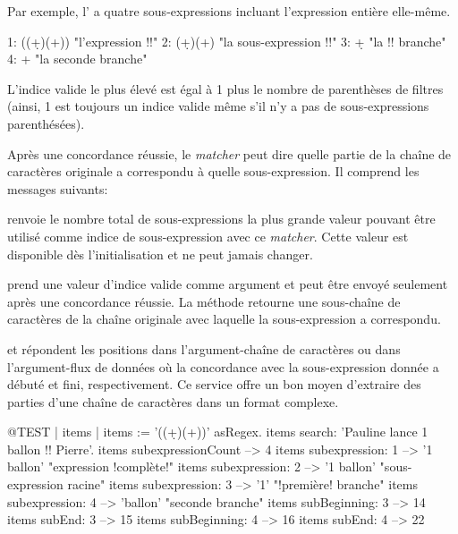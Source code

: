 \documentclass[a4paper,10pt,twoside]{book}
\begin{document}
Par exemple, l'\expreg \ct{((\d+)\s*(\w+))} a quatre sous-expressions
incluant l'expression entière elle-même.
\begin{code}{}
1:    ((\d+)\s*(\w+))    "l'expression !!"
2:    (\d+)\s*(\w+)       "la sous-expression !!"
3:    \d+                      "la !! branche"
4:    \w+                     "la seconde branche"
\end{code}

L'indice valide le plus élevé est égal à 1 plus le nombre de
parenthèses de filtres (ainsi, 1 est toujours un indice valide même
s'il n'y a pas de sous-expressions parenthésées).

Après une concordance réussie, le \emph{matcher} peut dire quelle
partie de la chaîne de caractères originale a correspondu à quelle
sous-expression. Il comprend les messages suivants:

 renvoie le nombre total de
sous-expressions \ie la plus grande valeur pouvant être utilisé comme
indice de sous-expression avec ce \emph{matcher}. Cette valeur est
disponible dès l'initialisation et ne peut jamais changer.

 prend une valeur d'indice valide
comme argument et peut être envoyé seulement après une concordance
réussie. La méthode retourne une sous-chaîne de caractères de la
chaîne originale avec laquelle la sous-expression a correspondu.

 et 
répondent les positions dans l'argument-chaîne de caractères ou dans
l'argument-flux de données où la concordance avec la sous-expression
donnée a débuté et fini, respectivement.
Ce service offre un bon moyen d'extraire des parties d'une chaîne de
caractères dans un format complexe.

\begin{code}{@TEST | items |}
items := '((\d+)\s*(\w+))' asRegex.
items search: 'Pauline lance 1 ballon !! Pierre'.
items subexpressionCount --> 4
items subexpression: 1      --> '1 ballon'    "expression !complète!"
items subexpression: 2      --> '1 ballon'    "sous-expression racine"
items subexpression: 3      --> '1'             "!première! branche"
items subexpression: 4      --> 'ballon'       "seconde branche"
items subBeginning: 3       --> 14
items subEnd: 3                 --> 15
items subBeginning: 4       --> 16
items subEnd: 4                 --> 22
\end{code}
\end{document}
